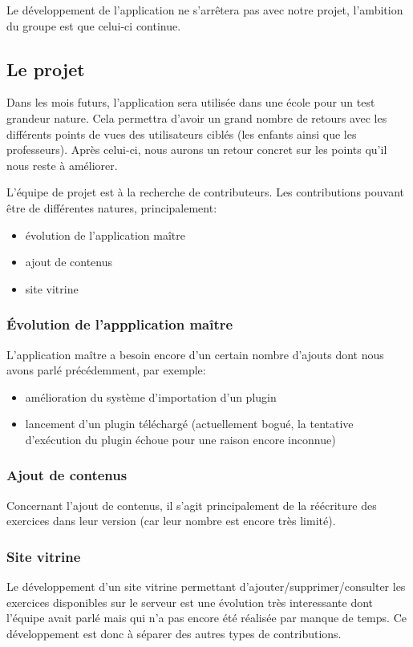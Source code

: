 Le développement de l'application ne s'arrêtera pas avec notre projet, l'ambition du groupe est que celui-ci continue.


\subsection{Le projet}
Dans les mois futurs, l'application sera utilisée dans une école pour un test grandeur nature. 
Cela permettra d'avoir un grand nombre de retours avec les différents points de vues des utilisateurs ciblés (les enfants ainsi que les professeurs). 
Après celui-ci, nous aurons un retour concret sur les points qu'il nous reste à améliorer.


L'équipe de projet est à la recherche de contributeurs. Les contributions pouvant être de différentes natures, principalement:
\begin{itemize}
    \item évolution de l'application maître
    \item ajout de contenus
    \item site vitrine
\end{itemize}

\subsubsection{\'{E}volution de l'appplication maître}
L'application maître a besoin encore d'un certain nombre d'ajouts dont nous avons parlé précédemment, par exemple:
\begin{itemize}
    \item amélioration du système d'importation d'un plugin
    \item lancement d'un plugin téléchargé (actuellement bogué, la tentative d'exécution du plugin échoue pour une raison encore inconnue)
\end{itemize}

\subsubsection{Ajout de contenus}
Concernant l'ajout de contenus, il s'agit principalement de la réécriture des exercices dans leur version \android{} (car leur nombre est encore très limité).

\subsubsection{Site vitrine}
Le développement d'un site vitrine permettant d'ajouter/supprimer/consulter les exercices disponibles sur le serveur est une évolution très interessante dont l'équipe avait parlé mais qui n'a pas encore été réalisée par manque de temps. Ce développement est donc à séparer des autres \og{}types\fg{} de contributions.

